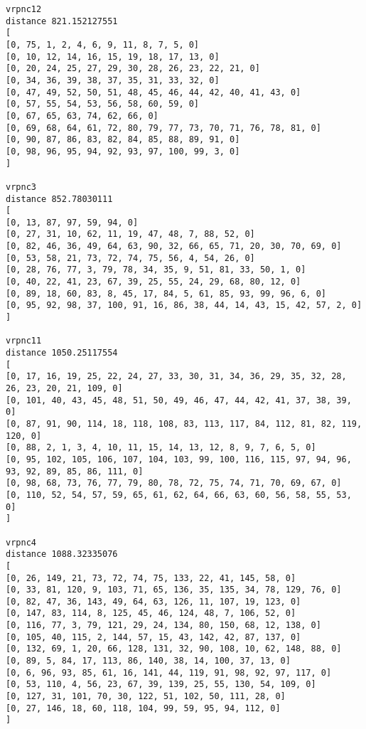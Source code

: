 \documentclass{article} %
\begin{document}
{\begin{lstlisting}[breaklines, basicstyle=\tiny]
vrpnc12
distance 821.152127551
[
[0, 75, 1, 2, 4, 6, 9, 11, 8, 7, 5, 0]
[0, 10, 12, 14, 16, 15, 19, 18, 17, 13, 0]
[0, 20, 24, 25, 27, 29, 30, 28, 26, 23, 22, 21, 0]
[0, 34, 36, 39, 38, 37, 35, 31, 33, 32, 0]
[0, 47, 49, 52, 50, 51, 48, 45, 46, 44, 42, 40, 41, 43, 0]
[0, 57, 55, 54, 53, 56, 58, 60, 59, 0]
[0, 67, 65, 63, 74, 62, 66, 0]
[0, 69, 68, 64, 61, 72, 80, 79, 77, 73, 70, 71, 76, 78, 81, 0]
[0, 90, 87, 86, 83, 82, 84, 85, 88, 89, 91, 0]
[0, 98, 96, 95, 94, 92, 93, 97, 100, 99, 3, 0]
]

vrpnc3
distance 852.78030111
[
[0, 13, 87, 97, 59, 94, 0]
[0, 27, 31, 10, 62, 11, 19, 47, 48, 7, 88, 52, 0]
[0, 82, 46, 36, 49, 64, 63, 90, 32, 66, 65, 71, 20, 30, 70, 69, 0]
[0, 53, 58, 21, 73, 72, 74, 75, 56, 4, 54, 26, 0]
[0, 28, 76, 77, 3, 79, 78, 34, 35, 9, 51, 81, 33, 50, 1, 0]
[0, 40, 22, 41, 23, 67, 39, 25, 55, 24, 29, 68, 80, 12, 0]
[0, 89, 18, 60, 83, 8, 45, 17, 84, 5, 61, 85, 93, 99, 96, 6, 0]
[0, 95, 92, 98, 37, 100, 91, 16, 86, 38, 44, 14, 43, 15, 42, 57, 2, 0]
]

vrpnc11
distance 1050.25117554
[
[0, 17, 16, 19, 25, 22, 24, 27, 33, 30, 31, 34, 36, 29, 35, 32, 28, 26, 23, 20, 21, 109, 0]
[0, 101, 40, 43, 45, 48, 51, 50, 49, 46, 47, 44, 42, 41, 37, 38, 39, 0]
[0, 87, 91, 90, 114, 18, 118, 108, 83, 113, 117, 84, 112, 81, 82, 119, 120, 0]
[0, 88, 2, 1, 3, 4, 10, 11, 15, 14, 13, 12, 8, 9, 7, 6, 5, 0]
[0, 95, 102, 105, 106, 107, 104, 103, 99, 100, 116, 115, 97, 94, 96, 93, 92, 89, 85, 86, 111, 0]
[0, 98, 68, 73, 76, 77, 79, 80, 78, 72, 75, 74, 71, 70, 69, 67, 0]
[0, 110, 52, 54, 57, 59, 65, 61, 62, 64, 66, 63, 60, 56, 58, 55, 53, 0]
]

vrpnc4
distance 1088.32335076
[
[0, 26, 149, 21, 73, 72, 74, 75, 133, 22, 41, 145, 58, 0]
[0, 33, 81, 120, 9, 103, 71, 65, 136, 35, 135, 34, 78, 129, 76, 0]
[0, 82, 47, 36, 143, 49, 64, 63, 126, 11, 107, 19, 123, 0]
[0, 147, 83, 114, 8, 125, 45, 46, 124, 48, 7, 106, 52, 0]
[0, 116, 77, 3, 79, 121, 29, 24, 134, 80, 150, 68, 12, 138, 0]
[0, 105, 40, 115, 2, 144, 57, 15, 43, 142, 42, 87, 137, 0]
[0, 132, 69, 1, 20, 66, 128, 131, 32, 90, 108, 10, 62, 148, 88, 0]
[0, 89, 5, 84, 17, 113, 86, 140, 38, 14, 100, 37, 13, 0]
[0, 6, 96, 93, 85, 61, 16, 141, 44, 119, 91, 98, 92, 97, 117, 0]
[0, 53, 110, 4, 56, 23, 67, 39, 139, 25, 55, 130, 54, 109, 0]
[0, 127, 31, 101, 70, 30, 122, 51, 102, 50, 111, 28, 0]
[0, 27, 146, 18, 60, 118, 104, 99, 59, 95, 94, 112, 0]
]


\end{lstlisting}}
\end{document}
